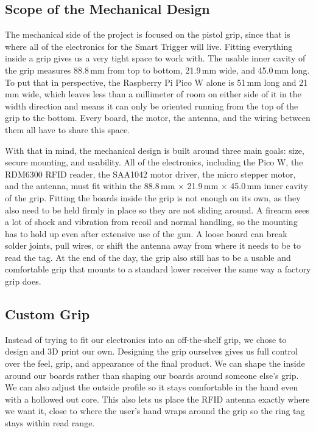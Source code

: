 \label{sec:cad}

\subsection{Scope of the Mechanical Design}
The mechanical side of the project is focused on the pistol grip, since that is where
all of the electronics for the Smart Trigger will live. Fitting everything inside a grip
gives us a very tight space to work with. The usable inner cavity of the grip measures
88.8\,mm from top to bottom, 21.9\,mm wide, and 45.0\,mm long. To put that in perspective,
the Raspberry Pi Pico W alone is 51\,mm long and 21\,mm wide, which leaves less than a
millimeter of room on either side of it in the width direction and means it can only
be oriented running from the top of the grip to the bottom. Every board, the motor,
the antenna, and the wiring between them all have to share this space.

With that in mind, the mechanical design is built around three main goals: size, secure
mounting, and usability. All of the electronics, including the
Pico W, the RDM6300 RFID reader, the SAA1042 motor driver, the micro stepper motor, and
the antenna, must fit within the 88.8\,mm $\times$ 21.9\,mm $\times$ 45.0\,mm inner
cavity of the grip. Fitting the boards inside the
grip is not enough on its own, as they also need to be held firmly in place so they are not
sliding around. A firearm sees a lot of shock and vibration from recoil and
normal handling, so the mounting has to hold up even after extensive use of the gun. A
loose board can break solder joints, pull wires, or shift the antenna away from where it
needs to be to read the tag. At the end of the day, the grip also
still has to be a usable and comfortable grip that mounts to a standard lower receiver
the same way a factory grip does.

\subsection{Custom Grip}
Instead of trying to fit our electronics into an off-the-shelf grip, we chose to design
and 3D print our own. Designing the grip ourselves gives us full control over the feel,
grip, and appearance of the final product. We can shape the inside around our boards
rather than shaping our boards around someone else's grip. We can also adjust the
outside profile so it stays comfortable in the hand even with a hollowed out core.
This also lets us place the RFID antenna exactly where we want it, close to where the
user's hand wraps around the grip so the ring tag stays within read range.


